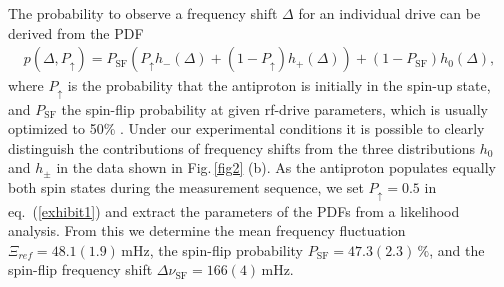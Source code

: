 \documentclass[12pt,preprint%
]{elsarticle}
\begin{document}
The probability to observe a frequency shift $\Delta$ for an individual drive can be derived from the PDF
\begin{eqnarray}
p(\Delta,P_{\uparrow}) = P_\mathrm{SF} \left(P_{\uparrow} h_-(\Delta) + (1 - P_{\uparrow}) h_+(\Delta)\right)+ %
(1-P_\mathrm{SF}) h_0(\Delta),
\label{exhibit1}
\end{eqnarray}
where $P_{\uparrow}$ is the probability that the antiproton is initially in the spin-up state, and $P_\mathrm{SF}$ the spin-flip probability at given rf-drive parameters, which is usually optimized to 50$\%$ \cite{BrownGeoniumLineshape}. Under our experimental conditions it is possible to clearly distinguish the contributions of frequency shifts from the three distributions $h_0$ and $h_\pm$ in the data shown in Fig.$\,$\ref{fig2} (b). As the antiproton populates equally both spin states during the measurement sequence, we set $P_{\uparrow}=0.5$ in eq.~(\ref{exhibit1}) and extract the parameters of the PDFs from a likelihood analysis. From this we determine the mean frequency fluctuation $\Xi_{ref}=48.1(1.9)\,$mHz, the spin-flip probability $P_\mathrm{SF}=47.3(2.3)\,\%$, and the spin-flip frequency shift $\Delta\nu_{\mathrm{SF}}=166(4)\,$mHz. 
\end{document}
